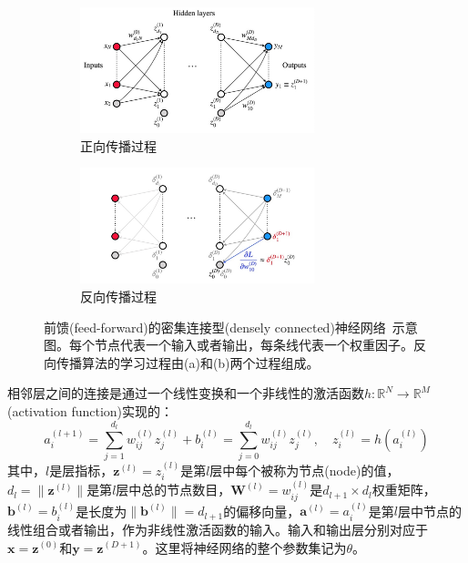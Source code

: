 \begin{figure}  
  \begin{center}
    \begin{subfigure}{.9\textwidth}
     \centering
    \includegraphics[width=0.75\textwidth]{figuresML/FP.jpg}
    \caption{正向传播过程}
    \end{subfigure}
    \begin{subfigure}{.9\textwidth}
     \centering
    \includegraphics[width=0.75\textwidth]{figuresML/BP.jpg}
    \caption{反向传播过程}
    \end{subfigure}
  \end{center}
  \caption{
前馈(feed-forward)的密集连接型(densely connected)神经网络~\cite{FDNN}示意图。每个节点代表一个输入或者输出，每条线代表一个权重因子。反向传播算法的学习过程由(a)和(b)两个过程组成。
  }
  \label{fig:BP}
\end{figure}

相邻层之间的连接是通过一个线性变换和一个非线性的激活函数$h:\mathbb{R}^N\rightarrow\mathbb{R}^M$(activation function)实现的：
\begin{equation} 
\label{eq:ml1}	
a_{i}^{(l+1)}=\sum_{j=1}^{d_l} w_{ij}^{(l)}z_{j}^{(l)} + b_{i}^{(l)} = \sum_{j=0}^{d_l} w_{ij}^{(l)}z_{j}^{(l)}, \quad z_{i}^{(l)}=h(a_{i}^{(l)})
\end{equation}
其中，$l$是层指标，$\boldsymbol{z}^{(l)}={z_{i}^{(l)}}$是第$l$层中每个被称为节点(node)的值，$d_l=\|\boldsymbol{z}^{(l)}\|$是第$l$层中总的节点数目，$\boldsymbol{W}^{(l)}={w_{ij}^{(l)}}$是$d_{l+1} \times d_l$权重矩阵，
$\boldsymbol{b}^{(l)}={b_{i}^{(l)}}$是长度为$\|\boldsymbol{b}^{(l)}\|=d_{l+1}$的偏移向量，$\boldsymbol{a}^{(l)}={a_{i}^{(l)}}$是第$l$层中节点的线性组合或者输出，作为非线性激活函数的输入。输入和输出层分别对应于$\boldsymbol{x}=\boldsymbol{z}^{(0)}$和$\boldsymbol{y}=\boldsymbol{z}^{(D+1)}$。这里将神经网络的整个参数集记为$\theta$。

